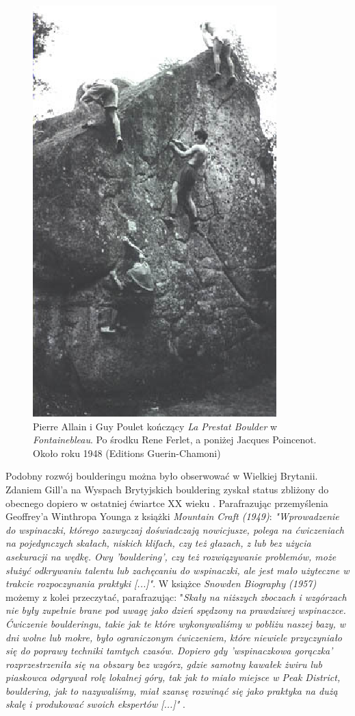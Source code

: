 \documentclass{article}
\begin{document}
\begin{figure}[!htbp]
	\begin{center}
		\includegraphics[width=0.35\linewidth]{images/allain-2.eps}
	\end{center}
	\caption{Pierre Allain i Guy Poulet kończący \textit{La Prestat Boulder} w \textit{Fontainebleau}. Po środku Rene Ferlet, a poniżej Jacques Poincenot. Około roku 1948 (Editions Guerin-Chamoni) \cite{gill-history2}}
	\label{allain-2}
\end{figure}

Podobny rozwój boulderingu można było obserwować w Wielkiej Brytanii. Zdaniem Gill'a na Wyspach Brytyjskich bouldering zyskał status zbliżony do obecnego dopiero w ostatniej ćwiartce XX wieku \cite{gill-history-1.2}. Parafrazując przemyślenia Geoffrey'a Winthropa Younga z książki \textit{Mountain Craft (1949)}: \textit{"Wprowadzenie do wspinaczki, którego zazwyczaj doświadczają nowicjusze, polega na ćwiczeniach na pojedynczych skałach, niskich klifach, czy też głazach, z lub bez użycia asekuracji na wędkę. Owy 'bouldering', czy też rozwiązywanie problemów, może służyć odkrywaniu talentu lub zachęcaniu do wspinaczki, ale jest mało użyteczne w trakcie rozpoczynania praktyki [...]"}. W książce \textit{Snowden Biography (1957)} możemy z kolei przeczytać, parafrazując: "\textit{Skały na niższych zboczach i wzgórzach nie były zupełnie brane pod uwagę jako dzień spędzony na prawdziwej wspinaczce. Ćwiczenie boulderingu, takie jak te które wykonywaliśmy w pobliżu naszej bazy, w dni wolne lub mokre, było ograniczonym ćwiczeniem, które niewiele przyczyniało się do poprawy techniki tamtych czasów. Dopiero gdy 'wspinaczkowa gorączka' rozprzestrzeniła się na obszary bez wzgórz, gdzie samotny kawałek żwiru lub piaskowca odgrywał rolę lokalnej góry, tak jak to miało miejsce w Peak District, bouldering, jak to nazywaliśmy, miał szansę rozwinąć się jako praktyka na dużą skalę i produkować swoich ekspertów [...]"} \cite{gill-history-1.2}.
\end{document}
